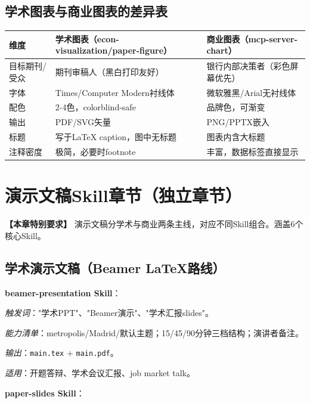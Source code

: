 \subsection{学术图表与商业图表的差异表}

\begin{table}[H]
\centering
\begin{tabular}{lp{5cm}p{6cm}}
\toprule
\textbf{维度} & \textbf{学术图表（econ-visualization/paper-figure）} & \textbf{商业图表（mcp-server-chart）} \\
\midrule
目标期刊/受众 & 期刊审稿人（黑白打印友好） & 银行内部决策者（彩色屏幕优先） \\
字体 & Times/Computer Modern衬线体 & 微软雅黑/Arial无衬线体 \\
配色 & 2-4色，colorblind-safe & 品牌色，可渐变 \\
输出 & PDF/SVG矢量 & PNG/PPTX嵌入 \\
标题 & 写于LaTeX caption，图中无标题 & 图表内含大标题 \\
注释密度 & 极简，必要时footnote & 丰富，数据标签直接显示 \\
\bottomrule
\end{tabular}
\end{table}

\section{演示文稿Skill章节（独立章节）}


\textbf{【本章特别要求】} 演示文稿分学术与商业两条主线，对应不同Skill组合。涵盖6个核心Skill。

\subsection{学术演示文稿（Beamer LaTeX路线）}

\textbf{beamer-presentation Skill}：

\textit{触发词}："学术PPT"、"Beamer演示"、"学术汇报slides"。

\textit{能力清单}：metropolis/Madrid/默认主题；15/45/90分钟三档结构；演讲者备注。

\textit{输出}：\texttt{main.tex} + \texttt{main.pdf}。

\textit{适用}：开题答辩、学术会议汇报、job market talk。

\textbf{paper-slides Skill}：

